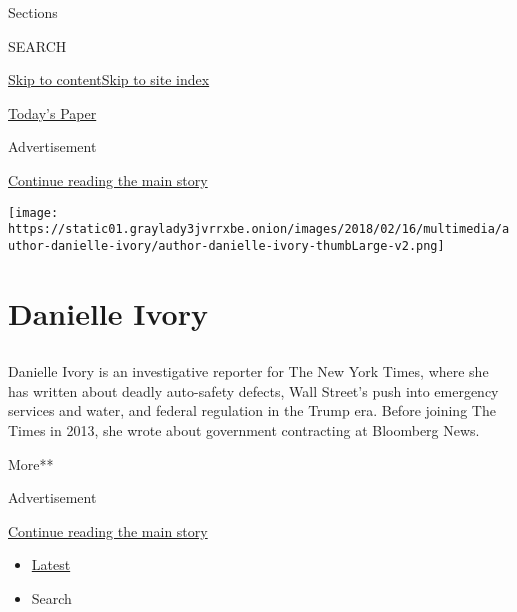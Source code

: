 Sections

SEARCH

\protect\hyperlink{site-content}{Skip to
content}\protect\hyperlink{site-index}{Skip to site index}

\href{https://myaccount.nytimes3xbfgragh.onion/auth/login?response_type=cookie\&client_id=vi}{}

\href{https://www.nytimes3xbfgragh.onion/section/todayspaper}{Today's
Paper}

Advertisement

\protect\hyperlink{after-top}{Continue reading the main story}

\texttt{[image: https://static01.graylady3jvrrxbe.onion/images/2018/02/16/multimedia/author-danielle-ivory/author-danielle-ivory-thumbLarge-v2.png]}

\hypertarget{danielle-ivory}{%
\section{Danielle Ivory}\label{danielle-ivory}}

\hypertarget{section}{%
\subsection{}\label{section}}

Danielle Ivory is an investigative reporter for The New York Times,
where she has written about deadly auto-safety defects, Wall Street's
push into emergency services and water, and federal regulation in the
Trump era. Before joining The Times in 2013, she wrote about government
contracting at Bloomberg News.

More**

Advertisement

\protect\hyperlink{after-mid1}{Continue reading the main story}

\begin{itemize}
\tightlist
\item
  \protect\hyperlink{stream-panel}{Latest}
\item
  Search
\end{itemize}

